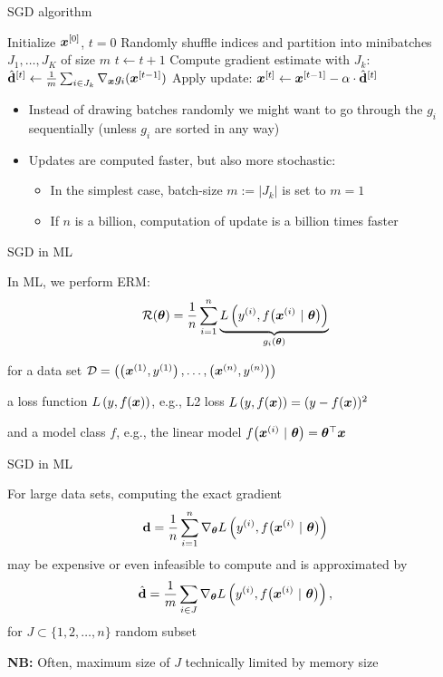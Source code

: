 \documentclass[11pt,compress,t,notes=noshow, xcolor=table]{beamer}
\begin{document}
\begin{framev}{SGD algorithm}
\begin{algorithm}[H]
\footnotesize
\caption{Basic SGD pseudo code}
\begin{algorithmic}[1]
\State Initialize $\bm{x}^{[0]}$, $t = 0$
\State Randomly shuffle indices and partition into minibatches $J_1, \ldots, J_K$ of size $m$
\State $t \leftarrow t + 1$
\State Compute gradient estimate with $J_k$: $\hat{\mathbf{d}}^{[t]} \leftarrow \frac{1}{m} \sum_{i \in J_k} \nabla_{\bm{x}} g_i(\bm{x}^{[t - 1]}) $
\State Apply update: $\bm{x}^{[t]} \leftarrow \bm{x}^{[t-1]} - \alpha \cdot \hat{\mathbf{d}}^{[t]}$
\EndFor
\EndWhile
\end{algorithmic}
\end{algorithm}
\begin{itemize}
\item Instead of drawing batches randomly we might want to go through the $g_i$ sequentially (unless $g_i$ are sorted in any way)
\item Updates are computed faster, but also more stochastic:
\begin{itemize}
\item In the simplest case, batch-size $m := |J_k|$ is set to $m = 1$
\item If $n$ is a billion, computation of update is a billion times faster
\end{itemize}
\end{itemize}
\end{framev}

\begin{framei}{SGD in ML}
\item In ML, we perform ERM:
$$
\mathcal{R}(\bm{\theta}) = \frac{1}{n}\sum\limits_{i=1}^n \underbrace{L\left(y^{(i)}, f\big(\bm{x}^{(i)} ~|~ \bm{\theta}\big)\right)}_{g_i(\bm{\theta})}
$$
\item for a data set $\mathcal{D} = \left( \left(\bm{x}^{(1)}, y^{(1)}\right), \ldots, \left(\bm{x}^{(n)}, y^{(n)}\right)\right)$
\item a loss function $L\left(y, f(\bm{x})\right)$, e.g., L2 loss $L\left(y, f(\bm{x})\right) = (y - f(\bm{x}))^2$
\item and a model class $f$, e.g., the linear model $f\big(\bm{x}^{(i)} ~|~ \bm{\theta}\big) = \bm{\theta}^\top \bm{x}$
\end{framei}

\begin{framei}{SGD in ML}
\item For large data sets, computing the exact gradient
$$
\mathbf{d} = \frac{1}{n}\sum_{i=1}^n \nabla_{\bm{\theta}} L\left(y^{(i)}, f\big(\bm{x}^{(i)} ~|~ \bm{\theta}\big)\right)
$$
may be expensive or even infeasible to compute and is approximated by
$$
\hat{\mathbf{d}} = \frac{1}{m}\sum_{i \in J} \nabla_{\bm{\theta}} L\left(y^{(i)}, f\big(\bm{x}^{(i)} ~|~ \bm{\theta}\big)\right),
$$
for $J \subset \{1, 2, \ldots, n\}$ random subset
\item \textbf{NB:} Often, maximum size of $J$ technically limited by memory size
\end{framei}
\end{document}
